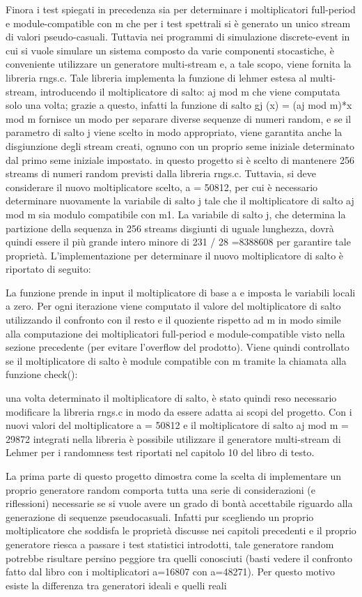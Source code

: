 Finora i test spiegati in precedenza sia per determinare i moltiplicatori full-period e module-compatible con m che per i test spettrali si è generato un unico stream di valori pseudo-casuali. Tuttavia nei programmi di simulazione discrete-event in cui si vuole simulare un sistema composto da varie componenti stocastiche, è conveniente utilizzare un generatore multi-stream e, a tale scopo, viene fornita la libreria rngs.c.
Tale libreria implementa la funzione di lehmer estesa al multi-stream, introducendo il moltiplicatore di salto: aj mod m che viene computata solo una volta; grazie a questo, infatti la funzione di salto gj (x) = (aj mod m)*x mod m fornisce un modo per separare diverse sequenze di numeri random, e se il parametro di salto j viene scelto in modo appropriato, viene garantita anche la disgiunzione degli stream creati, ognuno con un proprio seme iniziale determinato dal primo seme iniziale impostato.
in questo progetto si è scelto di mantenere 256 streams di numeri random previsti dalla libreria rngs.c. Tuttavia, si deve considerare il nuovo moltiplicatore scelto, a = 50812, per cui è necessario determinare nuovamente la variabile di salto j tale che il moltiplicatore di salto
aj mod m sia modulo compatibile con m1.
La variabile di salto j, che determina la partizione della sequenza in 256 streams disgiunti di uguale lunghezza, dovrà quindi essere il più grande intero minore di 231 / 28 =8388608 per garantire tale proprietà. L’implementazione per determinare il nuovo moltiplicatore di salto è riportato di seguito:

La funzione prende in input il moltiplicatore di base a e imposta le variabili locali a zero. Per ogni iterazione viene computato il valore del moltiplicatore di salto utilizzando il confronto con il resto e il quoziente rispetto ad m in modo simile alla computazione dei moltiplicatori full-period e module-compatible visto nella sezione precedente (per evitare l’overflow del prodotto). Viene quindi controllato se il moltiplicatore di salto è module compatible con m tramite la chiamata alla funzione check():

una volta determinato il moltiplicatore di salto, è stato quindi reso necessario modificare la libreria rngs.c in modo da essere adatta ai scopi del progetto. Con i nuovi valori del moltiplicatore a = 50812 e il moltiplicatore di salto aj mod m = 29872 integrati nella libreria è possibile utilizzare il generatore multi-stream di Lehmer per i randomness test riportati nel capitolo 10 del libro di testo.

La prima parte di questo progetto dimostra come la scelta di implementare un proprio generatore random comporta tutta una serie di considerazioni (e riflessioni) necessarie se si vuole avere un grado di bontà accettabile riguardo alla generazione di sequenze pseudocasuali. Infatti pur scegliendo un proprio moltiplicatore  che  soddisfa le proprietà discusse nei capitoli precedenti e il proprio generatore riesca a passare i test statistici introdotti, tale generatore random potrebbe risultare persino peggiore tra quelli conosciuti (basti vedere il confronto fatto dal libro con i moltiplicatori a=16807 con a=48271). Per questo motivo esiste la differenza tra generatori ideali e quelli reali
